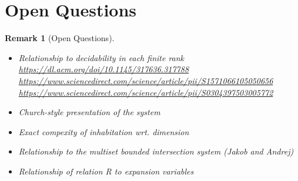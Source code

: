 \documentclass[10pt,a4paper]{article}
\theoremstyle{plain}%
\newtheorem{remark}[theorem]{Remark}
\begin{document}
\newpage

\section*{Open Questions}
\begin{remark}[Open Questions]
\begin{itemize}
\item Relationship to decidability in each finite rank\\
\url{https://dl.acm.org/doi/10.1145/317636.317788}\\
\url{https://www.sciencedirect.com/science/article/pii/S1571066105050656}\\
\url{https://www.sciencedirect.com/science/article/pii/S0304397503005772}
\item Church-style presentation of the system
\item Exact compexity of inhabitation wrt. dimension
\item Relationship to the multiset bounded intersection system (Jakob and Andrej)
\item Relationship of relation R to expansion variables
\end{itemize}
\end{remark}


\newpage

\printbibliography
\end{document}
